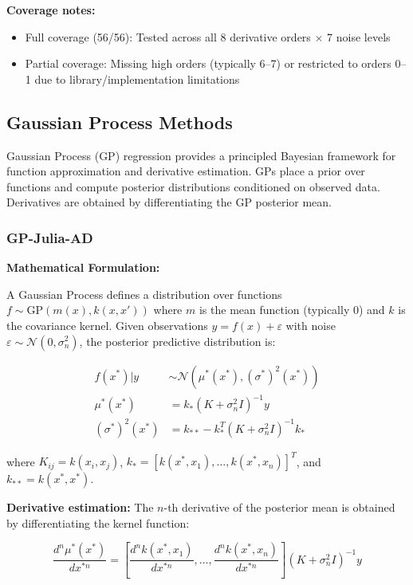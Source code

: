 \textbf{Coverage notes:}
\begin{itemize}
    \item Full coverage (56/56): Tested across all 8 derivative orders $\times$ 7 noise levels
    \item Partial coverage: Missing high orders (typically 6--7) or restricted to orders 0--1 due to library/implementation limitations
\end{itemize}

\subsection{Gaussian Process Methods}
\label{sec:gp_methods}

Gaussian Process (GP) regression provides a principled Bayesian framework for function approximation and derivative estimation. GPs place a prior over functions and compute posterior distributions conditioned on observed data. Derivatives are obtained by differentiating the GP posterior mean.

\subsubsection{GP-Julia-AD}

\textbf{Mathematical Formulation:}

A Gaussian Process defines a distribution over functions $f \sim \text{GP}(m(x), k(x,x'))$ where $m$ is the mean function (typically 0) and $k$ is the covariance kernel. Given observations $y = f(x) + \varepsilon$ with noise $\varepsilon \sim \mathcal{N}(0, \sigma^2_n)$, the posterior predictive distribution is:

\begin{align}
f(x^*) | y &\sim \mathcal{N}(\mu^*(x^*), (\sigma^*)^2(x^*)) \\
\mu^*(x^*) &= k_*(K + \sigma^2_n I)^{-1} y \\
(\sigma^*)^2(x^*) &= k_{**} - k_*^T(K + \sigma^2_n I)^{-1} k_*
\end{align}

where $K_{ij} = k(x_i, x_j)$, $k_* = [k(x^*, x_1), \ldots, k(x^*, x_n)]^T$, and $k_{**} = k(x^*, x^*)$.

\textbf{Derivative estimation:} The $n$-th derivative of the posterior mean is obtained by differentiating the kernel function:

\begin{equation}
\frac{d^n \mu^*(x^*)}{dx^{*n}} = \left[\frac{d^n k(x^*, x_1)}{dx^{*n}}, \ldots, \frac{d^n k(x^*, x_n)}{dx^{*n}}\right] (K + \sigma^2_n I)^{-1} y
\end{equation}


